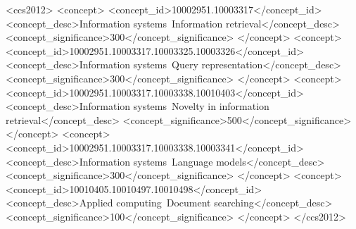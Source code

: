\documentclass[sigconf,natbib=true,anonymous=true]{acmart}
\begin{document}
\begin{CCSXML}
  <ccs2012>
     <concept>
         <concept_id>10002951.10003317</concept_id>
         <concept_desc>Information systems~Information retrieval</concept_desc>
         <concept_significance>300</concept_significance>
         </concept>
     <concept>
         <concept_id>10002951.10003317.10003325.10003326</concept_id>
         <concept_desc>Information systems~Query representation</concept_desc>
         <concept_significance>300</concept_significance>
         </concept>
     <concept>
         <concept_id>10002951.10003317.10003338.10010403</concept_id>
         <concept_desc>Information systems~Novelty in information retrieval</concept_desc>
         <concept_significance>500</concept_significance>
         </concept>
     <concept>
         <concept_id>10002951.10003317.10003338.10003341</concept_id>
         <concept_desc>Information systems~Language models</concept_desc>
         <concept_significance>300</concept_significance>
         </concept>
     <concept>
         <concept_id>10010405.10010497.10010498</concept_id>
         <concept_desc>Applied computing~Document searching</concept_desc>
         <concept_significance>100</concept_significance>
         </concept>
   </ccs2012>
\end{CCSXML}
  


\maketitle
\let\clearpage\relax  %
  
  







\end{document}
